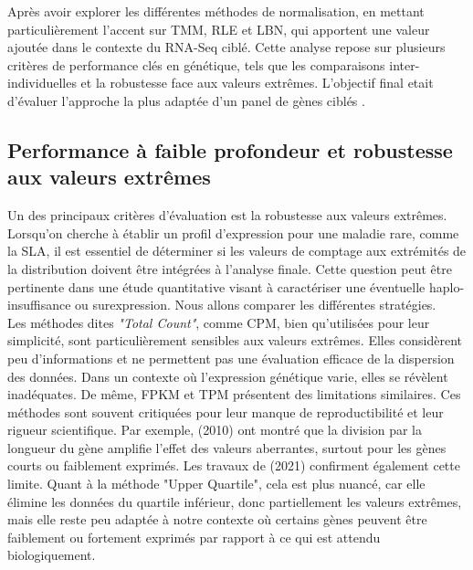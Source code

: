Après avoir explorer les différentes méthodes de normalisation, en mettant particulièrement l'accent sur TMM, RLE et LBN, qui apportent une valeur ajoutée dans le contexte du RNA-Seq ciblé. Cette analyse repose sur plusieurs critères de performance clés en génétique, tels que les comparaisons inter-individuelles et la robustesse face aux valeurs extrêmes.
 L'objectif final etait d'évaluer l'approche la plus adaptée  d'un panel de gènes ciblés .

\subsection{Performance à faible profondeur et robustesse aux valeurs extrêmes} \vspace{3mm} Un des principaux critères d’évaluation est la robustesse aux valeurs extrêmes. Lorsqu’on cherche à établir un profil d'expression pour une maladie rare, comme la SLA, il est essentiel de déterminer si les valeurs de comptage aux extrémités de la distribution doivent être intégrées à l'analyse finale. Cette question peut être pertinente dans une étude quantitative visant à caractériser une éventuelle haplo-insuffisance ou surexpression. Nous allons comparer les différentes stratégies.\\

Les méthodes dites \textit{"Total Count"}, comme CPM, bien qu’utilisées pour leur simplicité, sont particulièrement sensibles aux valeurs extrêmes\textsuperscript{\cite{dillies_comprehensive_2013}}. Elles considèrent peu d'informations et ne permettent pas une évaluation efficace de la dispersion des données. Dans un contexte où l'expression génétique varie, elles se révèlent inadéquates. De même, FPKM et TPM présentent des limitations similaires. Ces méthodes sont souvent critiquées pour leur manque de reproductibilité et leur rigueur scientifique. Par exemple, \citeauthor{robinson_scaling_2010} (2010) ont montré que la division par la longueur du gène amplifie l’effet des valeurs aberrantes, surtout pour les gènes courts ou faiblement exprimés\textsuperscript{\cite{anders_differential_2010}}. Les travaux de \citeauthor{zhao_tpm_2021} (2021) confirment également cette limite. Quant à la méthode "Upper Quartile", cela est plus nuancé, car elle élimine les données du quartile inférieur\textsuperscript{\cite{dillies_comprehensive_2013}}, donc partiellement les valeurs extrêmes, mais elle reste peu adaptée à notre contexte où certains gènes peuvent être faiblement ou fortement exprimés par rapport à ce qui est attendu biologiquement.\\


